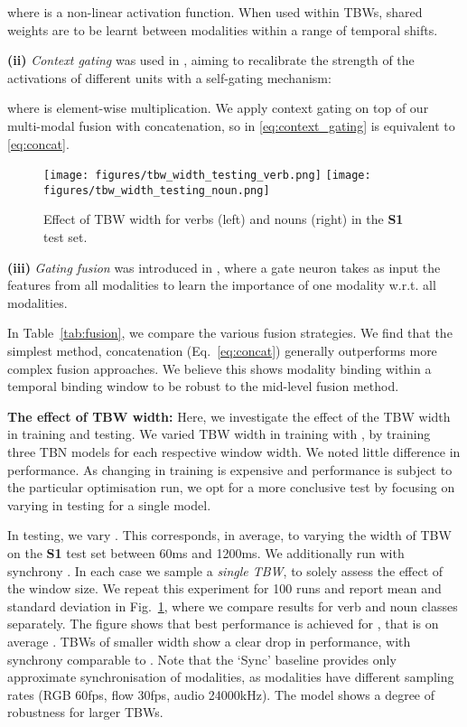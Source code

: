 \documentclass[10pt,twocolumn,letterpaper]{article}
\begin{document}
where  is a non-linear activation function.  When used within TBWs, shared weights  are to be learnt between modalities within a range of temporal shifts.


\noindent \textbf{(ii)} \textit{Context gating} was used in \cite{MiechLS17}, aiming to recalibrate the strength of the activations of different units with a self-gating mechanism:

where  is element-wise multiplication. We apply
context gating on top of our multi-modal fusion with concatenation, so  in \eqref{eq:context_gating} is equivalent to \eqref{eq:concat}. 

\begin{figure}[t]
\texttt{[image: figures/tbw\_width\_testing\_verb.png]} \texttt{[image: figures/tbw\_width\_testing\_noun.png]}
\caption{Effect of TBW width for verbs (left) and nouns (right) in the \textbf{S1} test set.}
\label{fig:tbw_analysis}
\end{figure}

\noindent \textbf{(iii)} \textit{Gating fusion} was introduced in \cite{gated_multimodal}, where a gate neuron takes as input the features from
all modalities to learn the importance of one modality w.r.t. all modalities. 

\noindent In Table~\ref{tab:fusion}, we compare the various fusion strategies. We find that the simplest method, concatenation (Eq.~\ref{eq:concat}) generally outperforms 
more complex fusion approaches. 
We believe this shows modality binding within a temporal binding window to be robust to the mid-level fusion method.



\noindent\textbf{The effect of TBW width:}
Here, we investigate the effect of the TBW width in training and testing.
We varied TBW width in training with , by training three TBN models for each respective window width. We noted little difference in performance. As changing  in training is expensive and performance is subject to the particular optimisation run, we opt for a more conclusive test by focusing on varying  in testing for a single model.


In testing, we vary . This corresponds, in average, to varying the width of TBW on the \textbf{S1} test set between 60ms and 1200ms.
We additionally run with synchrony . 
In each case we sample a \textit{single TBW}, to solely assess the effect of the window size. We repeat this experiment for 100 runs and report mean and standard deviation in Fig.~\ref{fig:tbw_analysis}, where we compare results for verb and noun classes separately. The figure shows that 
best performance is achieved for , that is on average . TBWs of smaller width show a clear drop in performance, with synchrony comparable to . 
Note that the `Sync' baseline provides only approximate synchronisation of modalities, as modalities have different sampling rates (RGB 60fps, flow 30fps, audio 24000kHz).
The model shows a degree of robustness for larger TBWs. 
\end{document}
